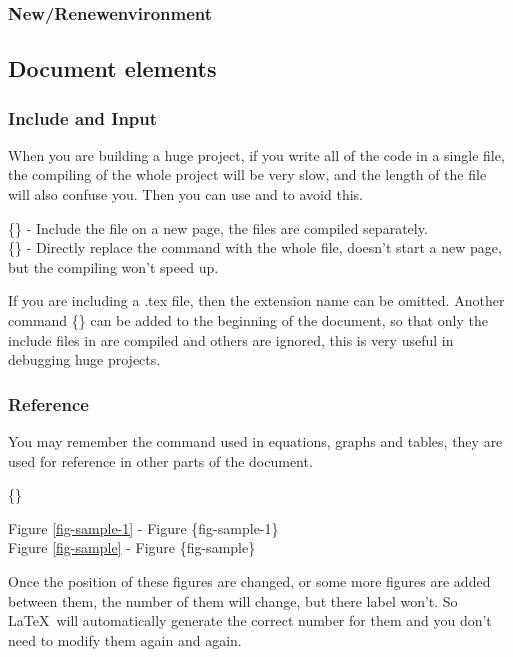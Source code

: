 \begin{frame}
	\frametitle{New/Renewenvironment}
\end{frame}

\subsection{Document elements}

\begin{frame}
	\frametitle{Include and Input}
	When you are building a huge project, if you write all of the code in a single file, the compiling of the whole project will be very slow, and the length of the file will also confuse you. Then you can use  and  to avoid this.
	\begin{command}
		\{\} - Include the file on a new page, the files are compiled separately.\\
		\{\} - Directly replace the command with the whole file, doesn't start a new page, but the compiling won't speed up.	
	\end{command} 
	If you are including a .tex file, then the extension name can be omitted. Another command \{\} can be added to the beginning of the document, so that only the include files in  are compiled and others are ignored, this is very useful in debugging huge projects.
\end{frame}

\begin{frame}
	\frametitle{Reference}
	You may remember the  command used in equations, graphs and tables, they are used for reference in other parts of the document.
	\begin{command}
		\{\structure{label}\}
	\end{command}
	\begin{example}
		Figure \ref{fig-sample-1} - Figure \{fig-sample-1\}\\
		Figure \ref{fig-sample} - Figure \{fig-sample\}
	\end{example}
	Once the position of these figures are changed, or some more figures are added between them, the number of them will change, but there label won't. So \LaTeX\ will automatically generate the correct number for them and you don't need to modify them again and again.
\end{frame}

